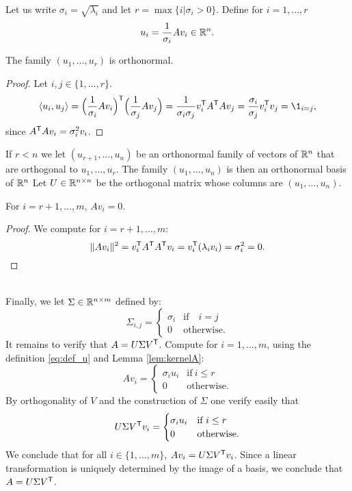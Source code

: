 \documentclass[11pt,nocut]{article}
\begin{document}
Let us write $\sigma_i = \sqrt{\lambda_i}$ and let $r = \max\{ i | \sigma_i > 0\}$.
Define for $i = 1, \dots, r$
\begin{equation}\label{eq:def_u}
	u_i = \frac{1}{\sigma_i} A v_i \in \mathbb{R}^n.
\end{equation}
\begin{lemma}
	The family $(u_1, \dots, u_r)$ is orthonormal.
\end{lemma}
\begin{proof}
	Let $i,j \in \{1, \dots, r \}$.
	$$
	\langle u_i, u_j \rangle = \Big(\frac{1}{\sigma_i} A v_i\Big)^{\sT}\Big(\frac{1}{\sigma_j} A v_j\Big) = \frac{1}{\sigma_i \sigma_j} v_i^{\sT} A^{\sT} A v_j
	= \frac{\sigma_i}{\sigma_j} v_i^{\sT} v_j = \1_{i = j},
	$$
	since $A^{{\sf T}} A v_i = \sigma_i^2 v_i$.
\end{proof}

If $r < n$ we let $(u_{r+1}, \dots, u_n)$ be an orthonormal family of vectors of $\mathbb{R}^n$ that are orthogonal to $u_1, \dots, u_r$. The family $(u_1, \dots, u_n)$ is then an orthonormal basis of $\mathbb{R}^n$
Let $U \in \mathbb{R}^{n \times n}$ be the orthogonal matrix whose columns are $(u_1, \dots, u_n)$.

\begin{lemma}\label{lem:kernelA}
	For $i = r+1, \dots, m$, $A v_i = 0$.
\end{lemma}
\begin{proof}
	We compute for $i = r+1, \dots, m$:
	$$
	\|Av_i \|^2 = v_i^{{\sf T}} A^{{\sf T}} A^{{\sf T}} v_i = v_i^{{\sf T}}(\lambda_i v_i) = \sigma_i^2 = 0.
	$$
\end{proof}
\\

Finally, we let $\Sigma \in \mathbb{R}^{n \times m}$ defined by:
$$
\Sigma_{i,j} =
\begin{cases}
	\sigma_i & \text{if} \quad i=j \\
	0 & \text{otherwise}.
\end{cases}
$$
It remains to verify that $A = U \Sigma V^{{\sf T}}$.
Compute for $i=1, \dots, m$, using the definition \eqref{eq:def_u} and Lemma \ref{lem:kernelA}:
$$
A v_i = 
\begin{cases}
	\sigma_i u_i & \text{if} \ i \leq r \\
	0 & \text{otherwise}.
\end{cases}
$$
By orthogonality of $V$ and the construction of $\Sigma$ one verify easily that
$$
U \Sigma V^{{\sf T}} v_i = 
\begin{cases}
	\sigma_i u_i & \text{if} \ i \leq r \\
	0 & \text{otherwise}.
\end{cases}
$$
We conclude that for all $i \in \{1, \dots, m\}$, $A v_i = U \Sigma V^{{\sf T}} v_i$. Since a linear transformation is uniquely determined by the image of a basis, we conclude that $A = U \Sigma V^{{\sf T}}$.
\\
\end{document}

